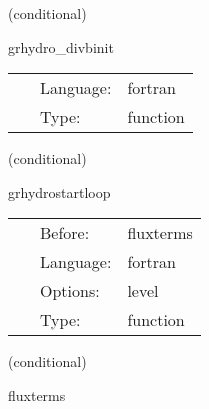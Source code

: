 \vspace{5mm}

   (conditional) 

\hspace{5mm} grhydro\_divbinit 

\hspace{5mm}{\it set divb initially to zero } 


\hspace{5mm}

 \begin{tabular*}{160mm}{cll} 
~ & Language:  & fortran \\ 
~ & Type:  & function \\ 
\end{tabular*} 


\vspace{5mm}

   (conditional) 

\hspace{5mm} grhydrostartloop 

\hspace{5mm}{\it set the flux\_direction variable } 


\hspace{5mm}

 \begin{tabular*}{160mm}{cll} 
~ & Before:  & fluxterms \\ 
~ & Language:  & fortran \\ 
~ & Options:  & level \\ 
~ & Type:  & function \\ 
\end{tabular*} 


\vspace{5mm}

   (conditional) 

\hspace{5mm} fluxterms 

\hspace{5mm}{\it calculation of intercell fluxes } 


\hspace{5mm}

